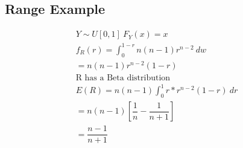 \documentclass[openany]{book}
\begin{document}
\begin{flushleft}
\subsection{Range Example}
\begin{multline*}
Y\sim U[0,1] \ F_Y(x)=x\\
f_R(r)=\int_{0}^{1-r}n(n-1)r^{n-2} \ dw\\
= n(n-1)r^{n-2}(1-r)\\
\text{R has a Beta distribution}\\
E(R)=n(n-1)\int_{0}^{1}r*r^{n-2}(1-r) \ dr\\
=n(n-1)\left[\dfrac{1}{n}-\dfrac{1}{n+1} \right]\\
=\dfrac{n-1}{n+1}\\
\end{multline*}
\end{flushleft}
\end{document}
